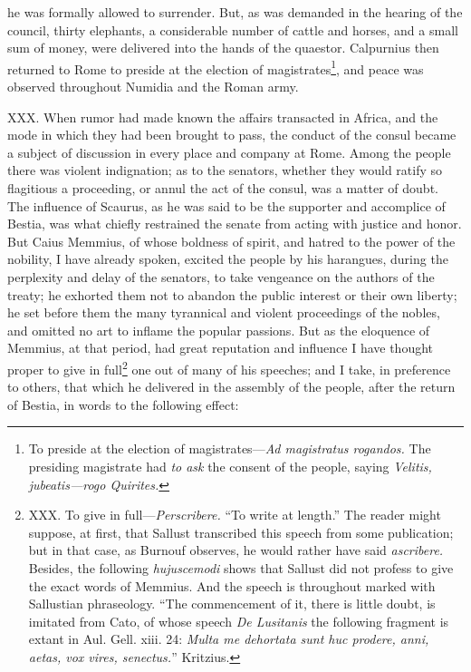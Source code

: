 he was formally allowed to surrender. But, as was demanded in the
hearing of the council, thirty elephants, a considerable number of
cattle and horses, and a small sum of money, were delivered into the
hands of the quaestor. Calpurnius then returned to Rome to preside at
the election of magistrates\footnote{To preside at the election of magistrates—\emph{Ad magistratus
rogandos.} The presiding magistrate had \emph{to ask} the consent of the
people, saying \emph{Velitis, jubeatis—rogo Quirites.}}, and peace was observed throughout
Numidia and the Roman army.

XXX. When rumor had made known the affairs transacted in Africa, and
the mode in which they had been brought to pass, the conduct of the
consul became a subject of discussion in every place and company at
Rome. Among the people there was violent indignation; as to the
senators, whether they would ratify so flagitious a proceeding, or
annul the act of the consul, was a matter of doubt. The influence of
Scaurus, as he was said to be the supporter and accomplice of Bestia,
was what chiefly restrained the senate from acting with justice and
honor. But Caius Memmius, of whose boldness of spirit, and hatred to
the power of the nobility, I have already spoken, excited the people
by his harangues, during the perplexity and delay of the senators, to
take vengeance on the authors of the treaty; he exhorted them not to
abandon the public interest or their own liberty; he set before them
the many tyrannical and violent proceedings of the nobles, and omitted
no art to inflame the popular passions. But as the eloquence of
Memmius, at that period, had great reputation and influence I have
thought proper to give in full\footnote{XXX. To give in full—\emph{Perscribere.} ``To write at length.''
The reader might suppose, at first, that Sallust transcribed this
speech from some publication; but in that case, as Burnouf observes,
he would rather have said \emph{ascribere.} Besides, the following
\emph{hujuscemodi} shows that Sallust did not profess to give the exact
words of Memmius. And the speech is throughout marked with Sallustian
phraseology. ``The commencement of it, there is little doubt, is
imitated from Cato, of whose speech \emph{De Lusitanis} the following
fragment is extant in Aul. Gell. xiii. 24: \emph{Multa me dehortata sunt
huc prodere, anni, aetas, vox vires, senectus.}'' Kritzius.} one out of many of his speeches;
and I take, in preference to others, that which he delivered in the
assembly of the people, after the return of Bestia, in words to the
following effect:

